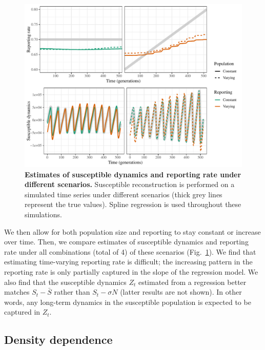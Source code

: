 \documentclass{article}
\newcommand{\fref}[1]{Fig.~\ref{fig:#1}}
\begin{document}
\begin{figure}[!t]
\includegraphics[width=\textwidth]{../figure/susceptible_reconstruction_compare.pdf}
\caption{
\textbf{Estimates of susceptible dynamics and reporting rate under different scenarios.}
Susceptible reconstruction is performed on a simulated time series under different scenarios (thick grey lines represent the true values).
Spline regression is used throughout these simulations.
}
\label{fig:tsircomp}
\end{figure}

We then allow for both population size and reporting to stay constant or increase over time.
Then, we compare estimates of susceptible dynamics and reporting rate under all combinations (total of 4) of these scenarios (\fref{tsircomp}).
We find that estimating time-varying reporting rate is difficult;
the increasing pattern in the reporting rate is only partially captured in the slope of the regression model.
We also find that the susceptible dynamics $Z_t$ estimated from a regression better matches $S_t - \bar{S}$ rather than $S_t - \sigma N$ (latter results are not shown).
In other words, any long-term dynamics in the susceptible population is expected to be captured in $Z_t$.

\subsection{Density dependence}
\end{document}
